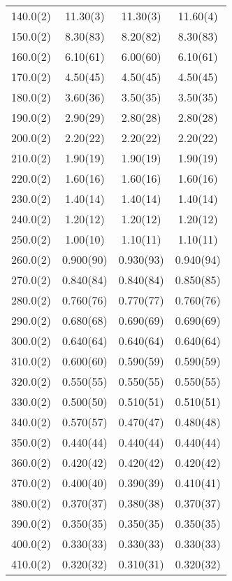 \begin{longtable}{S[table-format=3.1(1)] S[table-format=3.3(3)] S[table-format=3.3(3)] S[table-format=3.3(3)]}
        140.0(2) & 11.30(3) & 11.30(3) & 11.60(4)\\ 
        150.0(2) & 8.30(83) & 8.20(82) & 8.30(83)\\ 
        160.0(2) & 6.10(61) & 6.00(60) & 6.10(61)\\ 
        170.0(2) & 4.50(45) & 4.50(45) & 4.50(45)\\ 
        180.0(2) & 3.60(36) & 3.50(35) & 3.50(35)\\ 
        190.0(2) & 2.90(29) & 2.80(28) & 2.80(28)\\ 
        200.0(2) & 2.20(22) & 2.20(22) & 2.20(22)\\ 
        210.0(2) & 1.90(19) & 1.90(19) & 1.90(19)\\ 
        220.0(2) & 1.60(16) & 1.60(16) & 1.60(16)\\ 
        230.0(2) & 1.40(14) & 1.40(14) & 1.40(14)\\ 
        240.0(2) & 1.20(12) & 1.20(12) & 1.20(12)\\ 
        250.0(2) & 1.00(10) & 1.10(11) & 1.10(11)\\ 
        260.0(2) & 0.900(90) & 0.930(93) & 0.940(94)\\ 
        270.0(2) & 0.840(84) & 0.840(84) & 0.850(85)\\ 
        280.0(2) & 0.760(76) & 0.770(77) & 0.760(76)\\ 
        290.0(2) & 0.680(68) & 0.690(69) & 0.690(69)\\ 
        300.0(2) & 0.640(64) & 0.640(64) & 0.640(64)\\ 
        310.0(2) & 0.600(60) & 0.590(59) & 0.590(59)\\ 
        320.0(2) & 0.550(55) & 0.550(55) & 0.550(55)\\ 
        330.0(2) & 0.500(50) & 0.510(51) & 0.510(51)\\ 
        340.0(2) & 0.570(57) & 0.470(47) & 0.480(48)\\ 
        350.0(2) & 0.440(44) & 0.440(44) & 0.440(44)\\ 
        360.0(2) & 0.420(42) & 0.420(42) & 0.420(42)\\ 
        370.0(2) & 0.400(40) & 0.390(39) & 0.410(41)\\ 
        380.0(2) & 0.370(37) & 0.380(38) & 0.370(37)\\ 
        390.0(2) & 0.350(35) & 0.350(35) & 0.350(35)\\ 
        400.0(2) & 0.330(33) & 0.330(33) & 0.330(33)\\ 
        410.0(2) & 0.320(32) & 0.310(31) & 0.320(32)\\ 

\end{longtable}
